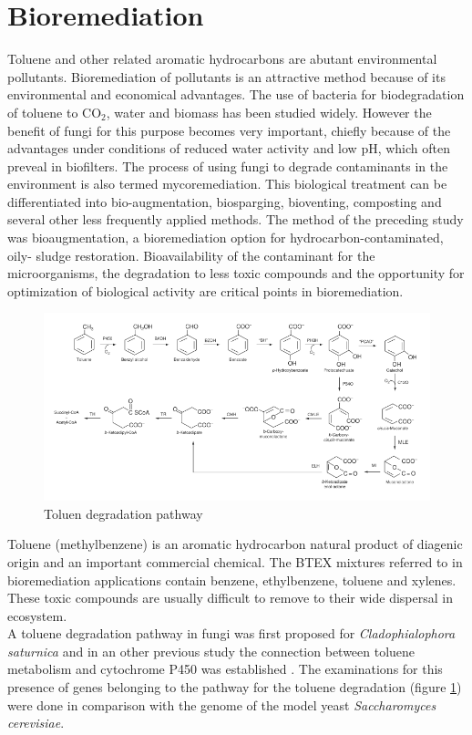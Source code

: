 \documentclass[12pt, a4paper]{report}
\begin{document}
\section{Bioremediation}
Toluene and other related aromatic hydrocarbons are abutant environmental pollutants. Bioremediation of pollutants is an attractive method because of its
environmental and economical advantages. The use of bacteria for biodegradation of toluene to CO$_2$, water and biomass has been studied widely. However the benefit of fungi for this purpose becomes very important, chiefly because of the advantages under conditions of reduced water activity and low pH, which often preveal in biofilters. \cite{Luykx2003} The process of using fungi to degrade contaminants in the environment is also termed mycoremediation. This biological treatment can be differentiated into bio-augmentation, biosparging, bioventing, composting and several other less frequently applied methods. The method of the preceding study was bioaugmentation, a bioremediation option for hydrocarbon-contaminated, oily- sludge restoration. Bioavailability of the contaminant for the microorganisms, the degradation to less toxic compounds and the opportunity for optimization of biological activity are critical points in bioremediation. \cite{Poyntner2014} \\

\begin{figure}[H]
	\centering	
	\includegraphics[width=420pt]{pics/toldegradation.png}
	\caption[Toluen degradation pathway]
	{Toluen degradation pathway}
	\label{Toluendeg}
\end{figure}

Toluene (methylbenzene) is an aromatic hydrocarbon natural product of diagenic origin and an important commercial chemical. The BTEX mixtures referred to in bioremediation applications contain benzene, ethylbenzene, toluene and xylenes. These toxic compounds are usually difficult to remove to their wide dispersal in ecosystem. 
\\
A toluene degradation pathway in fungi was first proposed for \textit{Cladophialophora saturnica} \cite{Badali2008} and in an other previous study the connection between toluene metabolism and cytochrome P450 was established \cite{Luykx2003}. The examinations for this presence of genes belonging to the pathway for the toluene degradation (figure \ref{Toluendeg}) were done in comparison with the genome of the model yeast \textit{Saccharomyces cerevisiae}. \cite{BarbaraBlasi2015} \\
\end{document}
